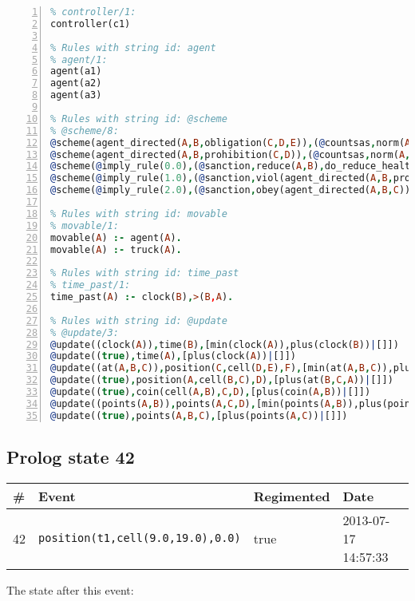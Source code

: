 \documentclass[11pt]{article}\usepackage[utf8]{inputenc}\usepackage{geometry}
\begin{document}
\begin{lstlisting}[language=Prolog, numbers=left]
% Rules with string id: controller
% controller/1:
controller(c1)

% Rules with string id: agent
% agent/1:
agent(a1)
agent(a2)
agent(a3)

% Rules with string id: @scheme
% @scheme/8:
@scheme(agent_directed(A,B,obligation(C,D,E)),(@countsas,norm(A,B,F,obligation(C,D,E)),F),false,(listTrue(C)),(time_past(D)),false,[plus(viol(agent_directed(A,B,obligation(C,D,E))))|[]],[plus(obey(agent_directed(A,B,obligation(C,D,E))))|[]])
@scheme(agent_directed(A,B,prohibition(C,D)),(@countsas,norm(A,B,E,prohibition(C,D)),E),(listTrue(C)),false,(false),false,[plus(viol(agent_directed(A,B,prohibition(C,D))))|[]],[plus(obey(agent_directed(A,B,prohibition(C,D))))|[]])
@scheme(@imply_rule(0.0),(@sanction,reduce(A,B),do_reduce_health(A,B),notifyAgent(A,changed(status))),true,false,false,false,[min(reduce(A,B))|[]],[])
@scheme(@imply_rule(1.0),(@sanction,viol(agent_directed(A,B,prohibition(C,D))),do_sanction(D)),true,false,false,false,[min(viol(agent_directed(A,B,prohibition(C,D))))|[]],[])
@scheme(@imply_rule(2.0),(@sanction,obey(agent_directed(A,B,C))),true,false,false,false,[min(obey(agent_directed(A,B,C)))|[]],[])

% Rules with string id: movable
% movable/1:
movable(A) :- agent(A).
movable(A) :- truck(A).

% Rules with string id: time_past
% time_past/1:
time_past(A) :- clock(B),>(B,A).

% Rules with string id: @update
% @update/3:
@update((clock(A)),time(B),[min(clock(A)),plus(clock(B))|[]])
@update((true),time(A),[plus(clock(A))|[]])
@update((at(A,B,C)),position(C,cell(D,E),F),[min(at(A,B,C)),plus(at(D,E,C))|[]])
@update((true),position(A,cell(B,C),D),[plus(at(B,C,A))|[]])
@update((true),coin(cell(A,B),C,D),[plus(coin(A,B))|[]])
@update((points(A,B)),points(A,C,D),[min(points(A,B)),plus(points(A,D))|[]])
@update((true),points(A,B,C),[plus(points(A,C))|[]])

\end{lstlisting}
\clearpage 
\subsection{Prolog state 42}
\begin{table}[ht]
\centering 
\begin{tabular}{l l l l} 
\textbf{\#} & \textbf{Event} & \textbf{Regimented} & \textbf{Date} \\ [0.5ex] 
\hline
42&\texttt{position(t1,cell(9.0,19.0),0.0)}&true&2013-07-17 14:57:33\\ [1ex] \hline\end{tabular}
\end{table}
The state after this event:
\end{document}
